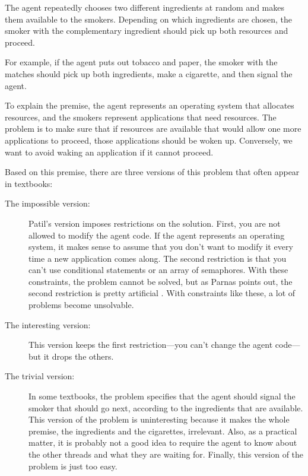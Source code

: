 \documentclass{book}
\begin{document}
The agent repeatedly chooses two different ingredients at random
and makes them available to the smokers.  Depending on which
ingredients are chosen, the smoker with the complementary ingredient
should pick up both resources and proceed.

For example, if the agent puts out tobacco and paper, the
smoker with the matches should pick up both ingredients, make
a cigarette, and then signal the agent.

To explain the premise, the agent represents an operating system that
allocates resources, and the smokers represent applications that need
resources.  The problem is to make sure that if resources are
available that would allow one more applications to proceed,
those applications should be woken up.  Conversely, we want to avoid
waking an application if it cannot proceed.



Based on this premise, there are three versions of this problem
that often appear in textbooks:

\begin{description}

\item[The impossible version:] Patil's version imposes restrictions on
the solution.  First, you are not allowed to modify the agent code.
If the agent represents an operating system, it makes sense to assume
that you don't want to modify it every time a new application comes
along.  The second restriction is that you can't use conditional
statements or an array of semaphores.  With these constraints, the
problem cannot be solved, but as Parnas points out, the second
restriction is pretty artificial \cite{Parnas}.  With constraints like
these, a lot of problems become unsolvable.

\item[The interesting version:] This version keeps the first
restriction---you can't change the agent code---but it drops the others.

\item[The trivial version:] In some textbooks, the problem specifies
that the agent should signal the smoker that should go next, according
to the ingredients that are available.  This version of the problem
is uninteresting because it makes the whole premise, the ingredients
and the cigarettes, irrelevant.  Also, as a practical matter, it is
probably not a good idea to require the agent to know about the other
threads and what they are waiting for.  Finally, this version of
the problem is just too easy.

\end{description}
\end{document}

